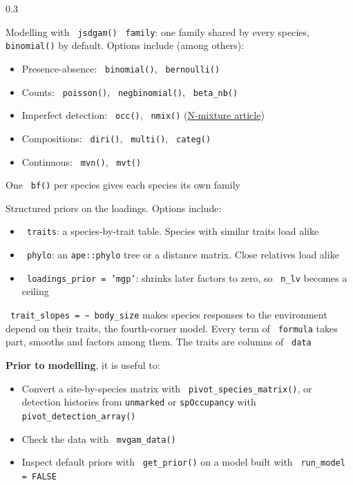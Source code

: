 \documentclass[final,9pt,fleqn]{beamer}\usepackage[]{graphicx}\usepackage[]{xcolor}
\begin{document}
\begin{frame}[fragile]
\begin{columns}
\begin{column}{0.3\paperwidth}
\begin{block}{{\fontsize{21}{21} \selectfont \color{BrickRed} Modelling with \texttt{\color{Orchid} jsdgam()}}}
\medskip
\texttt{\color{Orchid} family}: one family shared by every species, \texttt{\color{Orchid} binomial()} by default. Options include (among others):
\begin{itemize}
\item Presence-absence: \texttt{\color{Orchid} binomial()}, \texttt{\color{Orchid} bernoulli()}
\item Counts: \texttt{\color{Orchid} poisson()}, \texttt{\color{Orchid} negbinomial()}, \texttt{\color{Orchid} beta\_nb()}
\item Imperfect detection: \texttt{\color{Orchid} occ()}, \texttt{\color{Orchid} nmix()} (\href{https://nicholasjclark.github.io/mvgam/articles/nmix.html}{N-mixture article})
\item Compositions: \texttt{\color{Orchid} diri()}, \texttt{\color{Orchid} multi()}, \texttt{\color{Orchid} categ()}
\item Continuous: \texttt{\color{Orchid} mvn()}, \texttt{\color{Orchid} mvt()}
\end{itemize}
One \texttt{\color{Orchid} bf()} per species gives each species its own family

\medskip
Structured priors on the loadings. Options include:
\begin{itemize}
\item\texttt{\color{Orchid} traits}: a species-by-trait table. Species with similar traits load alike
\item\texttt{\color{Orchid} phylo}: an \texttt{ape::phylo} tree or a distance matrix. Close relatives load alike
\item\texttt{\color{Orchid} loadings\_prior = 'mgp'}: shrinks later factors to zero, so \texttt{\color{Orchid} n\_lv} becomes a ceiling
\end{itemize}
\texttt{\color{Orchid} trait\_slopes = \textasciitilde{} body\_size} makes species responses to the environment depend on their traits, the fourth-corner model. Every term of \texttt{\color{Orchid} formula} takes part, smooths and factors among them. The traits are columns of \texttt{\color{Orchid} data}

\medskip
\textbf{\color{BrickRed} Prior to modelling}, it is useful to:
\begin{itemize}
\item Convert a site-by-species matrix with \texttt{\color{Orchid} pivot\_species\_matrix()}, or detection histories from \texttt{unmarked} or \texttt{spOccupancy} with \texttt{\color{Orchid} pivot\_detection\_array()}
\item Check the data with \texttt{\color{Orchid} mvgam\_data()}
\item Inspect default priors with \texttt{\color{Orchid} get\_prior()} on a model built with \texttt{\color{Orchid} run\_model = FALSE}
\end{itemize}


\end{block}
\end{column}
\end{columns}
\end{frame}
\end{document}
